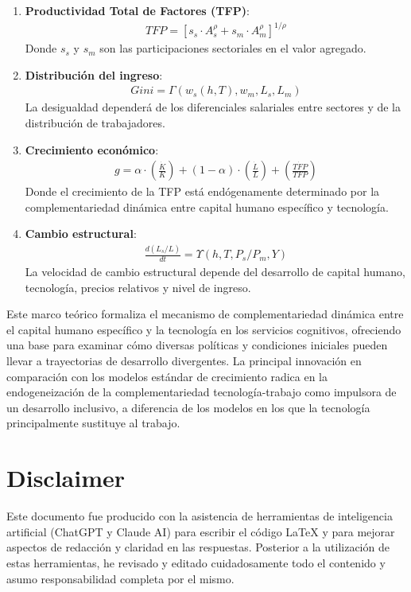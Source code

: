 \documentclass{article}
\theoremstyle{remark}
\theoremstyle{definition}
\begin{document}
\begin{tcolorbox}
\begin{enumerate}
\item \textbf{Productividad Total de Factores (TFP)}:
\begin{align}
TFP = [s_s \cdot A_s^{\rho} + s_m \cdot A_m^{\rho}]^{1/\rho}
\end{align}
Donde $s_s$ y $s_m$ son las participaciones sectoriales en el valor agregado.

\item \textbf{Distribución del ingreso}:
\begin{align}
Gini = \Gamma(w_s(h,T), w_m, L_s, L_m)
\end{align}
La desigualdad dependerá de los diferenciales salariales entre sectores y de la distribución de trabajadores.

\item \textbf{Crecimiento económico}:
\begin{align}
g = \alpha \cdot \left(\frac{\dot{K}}{K}\right) + (1-\alpha) \cdot \left(\frac{\dot{L}}{L}\right) + \left(\frac{\dot{TFP}}{TFP}\right)
\end{align}
Donde el crecimiento de la TFP está endógenamente determinado por la complementariedad dinámica entre capital humano específico y tecnología.

\item \textbf{Cambio estructural}:
\begin{align}
\frac{d(L_s/L)}{dt} = \Upsilon(h, T, P_s/P_m, Y)
\end{align}
La velocidad de cambio estructural depende del desarrollo de capital humano, tecnología, precios relativos y nivel de ingreso.
\end{enumerate}

Este marco teórico formaliza el mecanismo de complementariedad dinámica entre el capital humano específico y la tecnología en los servicios cognitivos, ofreciendo una base para examinar cómo diversas políticas y condiciones iniciales pueden llevar a trayectorias de desarrollo divergentes. La principal innovación en comparación con los modelos estándar de crecimiento radica en la endogeneización de la complementariedad tecnología-trabajo como impulsora de un desarrollo inclusivo, a diferencia de los modelos en los que la tecnología principalmente sustituye al trabajo.
\end{tcolorbox}

\nocite{*}

\printbibliography

\section*{Disclaimer}

Este documento fue producido con la asistencia de herramientas de inteligencia artificial (ChatGPT y Claude AI) para escribir el código LaTeX y para mejorar aspectos de redacción y claridad en las respuestas. Posterior a la utilización de estas herramientas, he revisado y editado cuidadosamente todo el contenido y asumo responsabilidad completa por el mismo.
\end{document}
